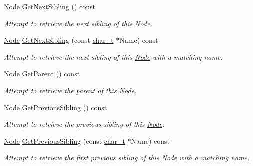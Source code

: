 \begin{DoxyCompactItemize}
\hyperlink{classphys_1_1xml_1_1Node}{Node} \hyperlink{classphys_1_1xml_1_1Node_a079c3f9835d5ee05b827ba540764e8bb}{GetNextSibling} () const 
\begin{DoxyCompactList}\small\item\em Attempt to retrieve the next sibling of this \hyperlink{classphys_1_1xml_1_1Node}{Node}. \item\end{DoxyCompactList}\item 
\hyperlink{classphys_1_1xml_1_1Node}{Node} \hyperlink{classphys_1_1xml_1_1Node_abd5e18e840cbfc2f8336c20782bec488}{GetNextSibling} (const \hyperlink{namespacephys_1_1xml_afc87705cd1c2917d87b879715a2d8f6e}{char\_\-t} $\ast$Name) const 
\begin{DoxyCompactList}\small\item\em Attempt to retrieve the next sibling of this \hyperlink{classphys_1_1xml_1_1Node}{Node} with a matching name. \item\end{DoxyCompactList}\item 
\hyperlink{classphys_1_1xml_1_1Node}{Node} \hyperlink{classphys_1_1xml_1_1Node_a80f32b90ed88ef442f99dc7a5f29ca0d}{GetParent} () const 
\begin{DoxyCompactList}\small\item\em Attempt to retrieve the parent of this \hyperlink{classphys_1_1xml_1_1Node}{Node}. \item\end{DoxyCompactList}\item 
\hyperlink{classphys_1_1xml_1_1Node}{Node} \hyperlink{classphys_1_1xml_1_1Node_aef027853db1468edcebb6dbdef6031a3}{GetPreviousSibling} () const 
\begin{DoxyCompactList}\small\item\em Attempt to retrieve the previous sibling of this \hyperlink{classphys_1_1xml_1_1Node}{Node}. \item\end{DoxyCompactList}\item 
\hyperlink{classphys_1_1xml_1_1Node}{Node} \hyperlink{classphys_1_1xml_1_1Node_adaf337574156c86bbdb76264c5451c8d}{GetPreviousSibling} (const \hyperlink{namespacephys_1_1xml_afc87705cd1c2917d87b879715a2d8f6e}{char\_\-t} $\ast$Name) const 
\begin{DoxyCompactList}\small\item\em Attempt to retrieve the first previous sibling of this \hyperlink{classphys_1_1xml_1_1Node}{Node} with a matching name. \item\end{DoxyCompactList}\item 

\end{DoxyCompactItemize}
